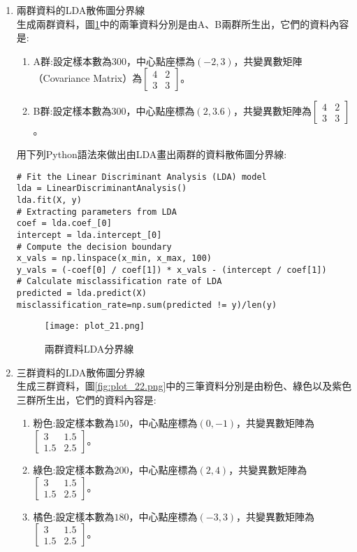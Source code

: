 \documentclass[12pt, a4paper]{article}
\begin{document}
\begin{enumerate}
\item 兩群資料的LDA散佈圖分界線\\
生成兩群資料，圖\;\ref{fig:plot_21.png}\;中的兩筆資料分別是由A、B兩群所生出，它們的資料內容是\;:
\begin{enumerate}
\item A群\;:\;設定樣本數為\;$300$\;，中心點座標為\;$(-2,3)$\;，共變異數矩陣（Covariance Matrix）為\;$\begin{bmatrix}4 & 2 \\3 & 3 \end{bmatrix}$\;。
\item B群\;:\;設定樣本數為\;$300$\;，中心點座標為\;$(2,3.6)$\;，共變異數矩陣為\;$\begin{bmatrix}4 & 2 \\3 & 3  \end{bmatrix}$\;。
\end{enumerate}

用下列Python語法來做出由LDA畫出兩群的資料散佈圖分界線\;:
\begin{lstlisting}
# Fit the Linear Discriminant Analysis (LDA) model
lda = LinearDiscriminantAnalysis()
lda.fit(X, y)
# Extracting parameters from LDA
coef = lda.coef_[0]
intercept = lda.intercept_[0]
# Compute the decision boundary
x_vals = np.linspace(x_min, x_max, 100)
y_vals = (-coef[0] / coef[1]) * x_vals - (intercept / coef[1])
# Calculate misclassification rate of LDA
predicted = lda.predict(X)
misclassification_rate=np.sum(predicted != y)/len(y)
\end{lstlisting}


\begin{figure}[h]
\centering
\texttt{[image: plot\_21.png]}
\caption{兩群資料LDA分界線}
\label{fig:plot_21.png}
\end{figure}

\item 三群資料的LDA散佈圖分界線\\
生成三群資料，圖\;\ref{fig:plot_22.png}\;中的三筆資料分別是由粉色、綠色以及紫色三群所生出，它們的資料內容是\;:
\begin{enumerate}
\item 粉色\;:\;設定樣本數為\;$150$\;，中心點座標為\;$(0,-1)$\;，共變異數矩陣為\;$\begin{bmatrix}3 & 1.5 \\1.5 & 2.5 \end{bmatrix}$\;。
\item 綠色\;:\;設定樣本數為\;$200$\;，中心點座標為\;$(2,4)$\;，共變異數矩陣為\;$\begin{bmatrix}3 & 1.5 \\1.5 & 2.5 \end{bmatrix}$\;。
\item 橘色\;:\;設定樣本數為\;$180$\;，中心點座標為\;$(-3,3)$\;，共變異數矩陣為\;$\begin{bmatrix}3 & 1.5 \\1.5 & 2.5 \end{bmatrix}$\;。
\end{enumerate}


\end{enumerate}
\end{document}
